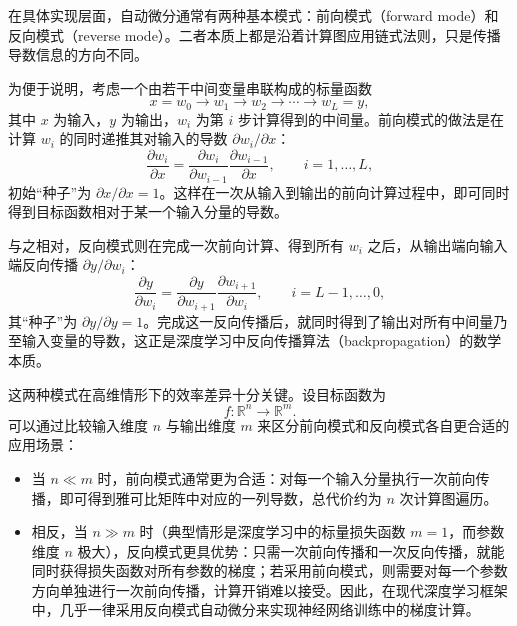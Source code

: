 在具体实现层面，自动微分通常有两种基本模式：前向模式（forward mode）和反向模式（reverse mode）。二者本质上都是沿着计算图应用链式法则，只是传播导数信息的方向不同。

为便于说明，考虑一个由若干中间变量串联构成的标量函数
\begin{equation}
    x = w_0 \longrightarrow w_1 \longrightarrow w_2 \longrightarrow \cdots \longrightarrow w_L = y,
\end{equation}
其中 $x$ 为输入，$y$ 为输出，$w_i$ 为第 $i$ 步计算得到的中间量。前向模式的做法是在计算 $w_i$ 的同时递推其对输入的导数 $\partial w_i/\partial x$：
\begin{equation}
    \frac{\partial w_i}{\partial x}
    = \frac{\partial w_i}{\partial w_{i-1}}
    \frac{\partial w_{i-1}}{\partial x},
    \qquad i = 1,\dots,L,
\end{equation}
初始“种子”为 $\partial x/\partial x = 1$。这样在一次从输入到输出的前向计算过程中，即可同时得到目标函数相对于某一个输入分量的导数。

与之相对，反向模式则在完成一次前向计算、得到所有 $w_i$ 之后，从输出端向输入端反向传播 $\partial y/\partial w_i$：
\begin{equation}
    \frac{\partial y}{\partial w_i}
    = \frac{\partial y}{\partial w_{i+1}}
    \frac{\partial w_{i+1}}{\partial w_i},
    \qquad i = L-1,\dots,0,
\end{equation}
其“种子”为 $\partial y/\partial y = 1$。完成这一反向传播后，就同时得到了输出对所有中间量乃至输入变量的导数，这正是深度学习中反向传播算法（backpropagation）的数学本质。

这两种模式在高维情形下的效率差异十分关键。设目标函数为
\begin{equation}
    f : \mathbb{R}^n \to \mathbb{R}^m.
\end{equation}
可以通过比较输入维度 $n$ 与输出维度 $m$ 来区分前向模式和反向模式各自更合适的应用场景：
\begin{itemize}
    \item 当 $n \ll m$ 时，前向模式通常更为合适：对每一个输入分量执行一次前向传播，即可得到雅可比矩阵中对应的一列导数，总代价约为 $n$ 次计算图遍历。
    \item 相反，当 $n \gg m$ 时（典型情形是深度学习中的标量损失函数 $m=1$，而参数维度 $n$ 极大），反向模式更具优势：只需一次前向传播和一次反向传播，就能同时获得损失函数对所有参数的梯度；若采用前向模式，则需要对每一个参数方向单独进行一次前向传播，计算开销难以接受。因此，在现代深度学习框架中，几乎一律采用反向模式自动微分来实现神经网络训练中的梯度计算。
\end{itemize}

